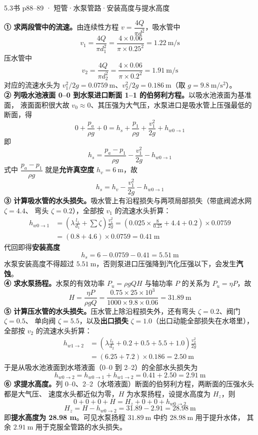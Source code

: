\begin{liti}{5.3}{书 p88--89 · 短管·水泵管路·安装高度与提水高度}
\begin{jie}
\textbf{① 求两段管中的流速。}由连续性方程 $v=\dfrac{4Q}{\pi d^2}$，吸水管中
\[ v_1=\frac{4Q}{\pi d_1^2}=\frac{4\times0.06}{\pi\times0.25^2}=1.22\ \mathrm{m/s} \]
压水管中
\[ v_2=\frac{4Q}{\pi d_2^2}=\frac{4\times0.06}{\pi\times0.2^2}=1.91\ \mathrm{m/s} \]
对应的流速水头为 $v_1^2/2g=0.0759\ \mathrm{m}$、$v_2^2/2g=0.186\ \mathrm{m}$（取 $g=9.8\ \mathrm{m/s^2}$）。\\
\textbf{② 列吸水池液面 0--0 到水泵进口断面 1--1 的伯努利方程。}以吸水池液面为基准面，
液面面积很大故 $v_0\approx0$、其压强为大气压，水泵进口是吸水管上压强最低的断面，得
\[ 0+\frac{p_a}{\rho g}+0=h_s+\frac{p_1}{\rho g}+\frac{v_1^2}{2g}+h_{w0\to1} \]
即
\[ h_s=\frac{p_a-p_1}{\rho g}-\frac{v_1^2}{2g}-h_{w0\to1} \]
式中 $\dfrac{p_a-p_1}{\rho g}$ 就是\textbf{允许真空度} $h_v=6\ \mathrm{m}$，故
\[ h_s=h_v-\frac{v_1^2}{2g}-h_{w0\to1} \]
\textbf{③ 计算吸水管的水头损失。}吸水管上有沿程损失与两项局部损失（带底阀滤水网 $\zeta=4.4$、
弯头 $\zeta=0.2$），全部按 $v_1$ 的流速水头折算：
\[
\begin{aligned}
h_{w0\to1}&=\left(\lambda\frac{l_1}{d_1}+\sum\zeta\right)\frac{v_1^2}{2g}
   =\left(0.025\times\frac{8}{0.25}+4.4+0.2\right)\times0.0759\\
   &=(0.8+4.6)\times0.0759=0.41\ \mathrm{m}
\end{aligned}
\]
代回即得\textbf{安装高度}
\[ h_s=6-0.0759-0.41=5.51\ \mathrm{m} \]
水泵安装高度不得超过 $5.51\ \mathrm{m}$，否则泵进口压强降到汽化压强以下，会发生\textbf{汽蚀}。\\
\textbf{④ 求水泵扬程。}水泵的有效功率 $P_u=\rho gQH$ 与轴功率 $P$ 的关系为 $P_u=\eta P$，故
\[ H=\frac{\eta P}{\rho gQ}=\frac{0.75\times25\times10^3}{1000\times9.8\times0.06}=31.89\ \mathrm{m} \]
\textbf{⑤ 计算压水管的水头损失。}压水管上除沿程损失外，还有弯头 $\zeta=0.2$、阀门 $\zeta=0.5$、
单向阀 $\zeta=5.5$，以及\textbf{出口损失} $\zeta=1.0$（出口动能全部损失在水塔里），
全部按 $v_2$ 的流速水头折算：
\[
\begin{aligned}
h_{w1\to2}&=\left(\lambda\frac{l_2}{d_2}+0.2+0.5+5.5+1.0\right)\frac{v_2^2}{2g}\\
   &=(6.25+7.2)\times0.186=2.50\ \mathrm{m}
\end{aligned}
\]
于是从吸水池液面到水塔液面（0--0 到 2--2）的全部水头损失为
\[ h_{w0\to2}=h_{w0\to1}+h_{w1\to2}=0.41+2.50=2.91\ \mathrm{m} \]
\textbf{⑥ 求提水高度。}列 0--0、2--2（水塔液面）断面的伯努利方程，两断面的压强水头都是大气压、
速度水头都近似为零，$H$ 为水泵扬程，设提水高度为 $H_z$，则
\[ 0+0+0+H=H_z+0+0+h_{w0\to2} \]
\[ H_z=H-h_{w0\to2}=31.89-2.91=28.98\ \mathrm{m} \]
即\textbf{提水高度为 28.98 m}。可见水泵扬程 $31.89\ \mathrm{m}$ 中约 $28.98\ \mathrm{m}$ 用于提升水体，
其余 $2.91\ \mathrm{m}$ 用于克服全管路的水头损失。
\end{jie}


\end{liti}
